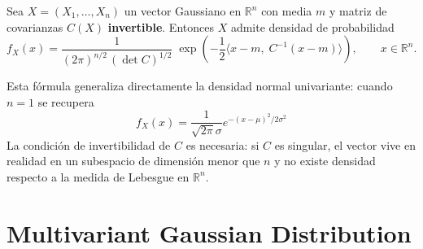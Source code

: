 \begin{teo}
    Sea $X=(X_1,\dots,X_n)$ un vector Gaussiano en $\mathbb{R}^n$ con media $m$ y matriz de covarianzas $C(X)$ \textbf{invertible}. Entonces $X$ admite densidad de probabilidad
    \[
    f_X(x) = \frac{1}{(2\pi)^{n/2}\,(\det C)^{1/2}} \; \exp\left(-\frac{1}{2}\langle x-m,\; C^{-1}(x-m)\rangle\right), \qquad x\in\mathbb{R}^n.
    \]
\end{teo}

\begin{observacion}
    Esta fórmula generaliza directamente la densidad normal univariante: cuando $n=1$ se recupera 
    $$f_X(x) = \frac{1}{\sqrt{2\pi}\sigma}e^{-(x-\mu)^2/2\sigma^2}$$
    La condición de invertibilidad de $C$ es necesaria: si $C$ es singular, el vector vive en realidad en un subespacio de dimensión menor que $n$ y no existe densidad respecto a la medida de Lebesgue en $\mathbb{R}^n$.
\end{observacion}

\section{Multivariant Gaussian Distribution}

